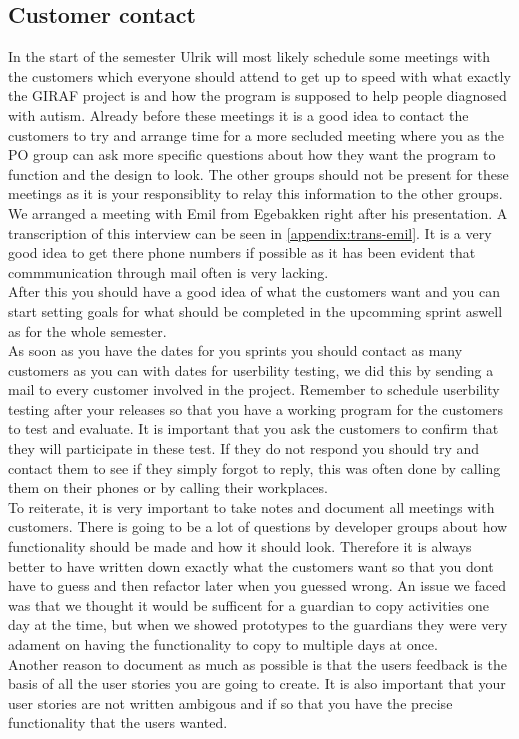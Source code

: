 \subsection{Customer contact}
In the start of the semester Ulrik will most likely schedule some meetings with the customers which everyone should attend to get up to speed with what exactly the GIRAF project is and how the program is supposed to help people diagnosed with autism.
Already before these meetings it is a good idea to contact the customers to try and arrange time for a more secluded meeting where you as the PO group can ask more specific questions about how they want the program to function and the design to look.
The other groups should not be present for these meetings as it is your responsiblity to relay this information to the other groups.
We arranged a meeting with Emil from Egebakken right after his presentation. 
A transcription of this interview can be seen in \autoref{appendix:trans-emil}.
It is a very good idea to get there phone numbers if possible as it has been evident that commmunication through mail often is very lacking.
\\
After this you should have a good idea of what the customers want and you can start setting goals for what should be completed in the upcomming sprint aswell as for the whole semester.
\\
As soon as you have the dates for you sprints you should contact as many customers as you can with dates for userbility testing, we did this by sending a mail to every customer involved in the project.
Remember to schedule userbility testing after your releases so that you have a working program for the customers to test and evaluate.
It is important that you ask the customers to confirm that they will participate in these test.
If they do not respond you should try and contact them to see if they simply forgot to reply, this was often done by calling them on their phones or by calling their workplaces.
\\
To reiterate, it is very important to take notes and document all meetings with customers.
There is going to be a lot of questions by developer groups about how functionality should be made and how it should look.
Therefore it is always better to have written down exactly what the customers want so that you dont have to guess and then refactor later when you guessed wrong.
An issue we faced was that we thought it would be sufficent for a guardian to copy activities one day at the time, but when we showed prototypes to the guardians they were very adament on having the functionality to copy to multiple days at once.
\\
Another reason to document as much as possible is that the users feedback is the basis of all the user stories you are going to create.
It is also important that your user stories are not written ambigous and if so that you have the precise functionality that the users wanted.

